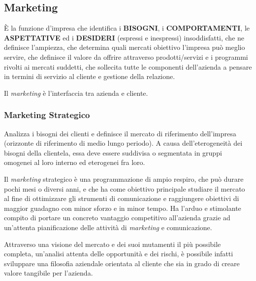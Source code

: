 \subsection{Marketing}
È la funzione d'impresa che identifica i \textbf{BISOGNI}, i \textbf{COMPORTAMENTI}, le \textbf{ASPETTATIVE} ed i \textbf{DESIDERI} (espressi e inespressi) insoddisfatti, che ne definisce l'ampiezza, che determina quali mercati obiettivo l'impresa può meglio servire, che definisce il valore da offrire attraverso prodotti/servizi e i programmi rivolti ai mercati suddetti, che sollecita tutte le componenti dell'azienda a pensare in termini di servizio al cliente e gestione della relazione.

Il \textit{marketing} è l'interfaccia tra azienda e cliente.

\subsubsection{Marketing Strategico}
Analizza i bisogni dei clienti e definisce il mercato di riferimento dell’impresa (orizzonte di riferimento di medio lungo periodo). A causa dell’eterogeneità dei bisogni della clientela, essa deve essere suddivisa o segmentata in gruppi omogenei al loro interno ed eterogenei fra loro.

Il \textit{marketing} strategico è una programmazione di ampio respiro, che può durare pochi mesi o diversi anni, e che ha come obiettivo principale studiare il mercato al fine di ottimizzare gli strumenti di comunicazione e raggiungere obiettivi di maggior guadagno con minor sforzo e in minor tempo.
Ha l’arduo e stimolante compito di portare un concreto vantaggio competitivo all’azienda grazie ad un’attenta pianificazione delle attività di \textit{marketing} e comunicazione.

Attraverso una visione del mercato e dei suoi mutamenti il più possibile completa, un’analisi attenta delle opportunità e dei rischi, è possibile infatti sviluppare una filosofia aziendale orientata al cliente che sia in grado di creare valore tangibile per l’azienda.

